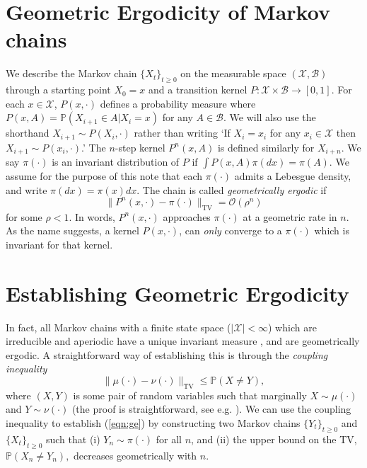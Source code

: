 \documentclass{article}
\newcommand{\X}{\mathcal{X}}
\newcommand{\B}{\mathcal{B}}
\newcommand{\TV}{\text{TV}}
\begin{document}
\section{Geometric Ergodicity of Markov chains}

We describe the Markov chain $\{ X_t \}_{t \geq 0}$ on the measurable space $(\mathcal{X},\mathcal{B})$ through a starting point $X_0 = x$ and a transition kernel $P: \X \times \B \to [0,1]$.  For each $x \in \X$, $P(x,\cdot)$ defines a probability measure where $P(x,A) = \mathbb{P}(X_{i+1} \in A |X_i = x)$ for any $A \in \B$.  We will also use the shorthand $X_{i+1} \sim P(X_i,\cdot)$ rather than writing `If $X_i = x_i$ for any $x_i \in \X$ then $X_{i+1} \sim P(x_i,\cdot)$.'  The $n$-step kernel $P^n(x,A)$ is defined similarly for $X_{i+n}$.  We say $\pi(\cdot)$ is an invariant distribution of $P$ if $\int P(x,A)\pi(dx) = \pi(A)$.  We assume for the purpose of this note that each $\pi(\cdot)$ admits a Lebesgue density, and write $\pi(dx) = \pi(x)dx$.  The chain is called \emph{geometrically ergodic} if
\begin{equation} \label{eqn:ge}
\| P^n(x,\cdot) - \pi(\cdot) \|_{\TV} = \mathcal{O}(\rho^n)
\end{equation}
for some $\rho < 1$.  In words, $P^n(x,\cdot)$ approaches $\pi(\cdot)$ at a geometric rate in $n$.  As the name suggests, a kernel $P(x,\cdot)$, can \emph{only} converge to a $\pi(\cdot)$ which is invariant for that kernel.

\section{Establishing Geometric Ergodicity}

In fact, all Markov chains with a finite state space ($|\mathcal{X}| < \infty$) which are irreducible and aperiodic have a unique invariant measure \cite{Norris_1997}, and are geometrically ergodic.  A straightforward way of establishing this is through the \emph{coupling inequality}
\begin{equation}
\|\mu(\cdot) - \nu(\cdot)\|_{\TV} \leq \mathbb{P}(X \neq Y),
\end{equation}
where $(X,Y)$ is some pair of random variables such that marginally $X \sim \mu(\cdot)$ and $Y \sim \nu(\cdot)$ (the proof is straightforward, see e.g. \cite{2004}).  We can use the coupling inequality to establish (\ref{eqn:ge}) by constructing two Markov chains $\{Y_t\}_{t \geq 0}$ and $\{ X_t\}_{t \geq 0}$ such that (i) $Y_n \sim \pi(\cdot)$ for all $n$, and (ii) the upper bound on the TV, $\mathbb{P}(X_n \neq Y_n),$ decreases geometrically with $n$. 
\end{document}

